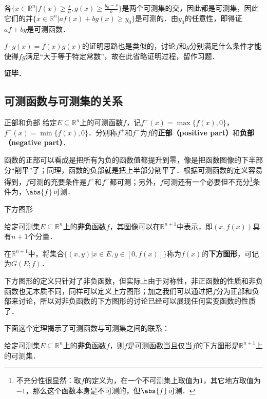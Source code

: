 各$\{x\in\mathbb{R}^n|f(x)\geq \frac{s}{a}, g(x)\geq \frac{y_0-s}{b}\}$是两个可测集的交，因此都是可测集，因此它们的并$\{x\in\mathbb{R}^n|af(x)+bg(x)\geq y_0\}$是可测的．由$y_0$的任意性，即得证$af+bg$是可测函数．

$f\cdot g(x)=f(x)g(x)$的证明思路也是类似的，讨论$f$和$g$分别满足什么条件才能使得$fg$满足“大于等于特定常数”，故在此省略证明过程，留作习题．


\textbf{证毕}．




\subsection{可测函数与可测集的关系}




\begin{definition}{正部和负部}
给定$E\subseteq\mathbb{R}^n$上的可测函数$f$，记$f^+(x)=\max\{f(x), 0\}$，$f^-(x)=\min\{f(x), 0\}$．分别称$f^+$和$f^-$为$f$的\textbf{正部（positive part）}和\textbf{负部（negative part）}．
\end{definition}

函数的正部可以看成是把所有为负的函数值都提升到零，像是把函数图像的下半部分“削平”了；同理，函数的负部就是把上半部分削平了．根据可测函数的定义容易得到，$f$可测的充要条件是$f^+$和$f^-$都可测；另外，$f$可测还有一个必要但不充分\footnote{不充分性很显然：取$f$的定义为，在一个不可测集上取值为$1$，其它地方取值为$-1$，那么这个函数本身是不可测的，但$\abs{f}$可测．}条件为，$\abs{f}$可测．

\begin{definition}{下方图形}

给定可测集$E\subseteq\mathbb{R}^n$上的\textbf{非负}函数$f$，其图像可以在$\mathbb{R}^{n+1}$中表示，即$(x, f(x))$具有$n+1$个分量．

在$\mathbb{R}^{n+1}$中，将集合$\{(x, y)|x\in E, y\in [0, f(x)]\}$称为$f(x)$的\textbf{下方图形}，可记为$G(E; f)$．

\end{definition}

下方图形的定义只针对了非负函数，但实际上由于对称性，非正函数的性质和非负函数也无本质不同，同样可以定义上方图形；加之我们可以通过把$f$分为正部和负部来讨论，所以对非负函数的下方图形的讨论已经可以展现任何实变函数的性质了．

下面这个定理揭示了可测函数与可测集之间的联系：

\begin{theorem}{}\label{MsbFun_the4}

给定可测集$E\subseteq\mathbb{R}^n$上的\textbf{非负}函数$f$，则$f$是可测函数当且仅当$f$的下方图形是$\mathbb{R}^{n+1}$上的可测集．

\end{theorem}

